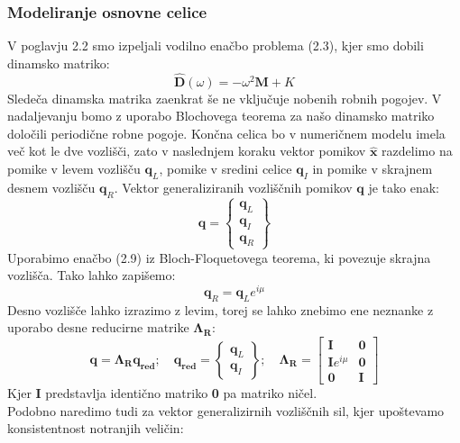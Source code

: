 \documentclass[12pt]{report}
\begin{document}
\subsubsection{Modeliranje osnovne celice}
V poglavju 2.2 smo izpeljali vodilno enačbo problema (2.3), kjer smo dobili dinamsko matriko:
\begin{equation}
  \mathbf{\hat{D}}(\omega)= -{\omega}^2 \mathbf{M}+K
\end{equation}
Sledeča dinamska matrika zaenkrat še ne vključuje nobenih robnih pogojev. V nadaljevanju bomo z uporabo Blochovega teorema za našo
dinamsko matriko določili periodične robne pogoje. Končna celica bo v numeričnem modelu imela več kot le dve vozlišči, zato v naslednjem koraku vektor pomikov $\mathbf{\hat{x}}$
razdelimo na pomike v levem vozlišču $\mathbf{q}_L$, pomike v sredini celice $\mathbf{q}_I$ in pomike v skrajnem desnem vozlišču $\mathbf{q}_R$. Vektor generaliziranih vozliščnih pomikov $\mathbf{q}$
je tako enak:
\begin{equation}
  \mathbf{q}=
    \begin{Bmatrix}
      \mathbf{q}_L \\
      \mathbf{q}_I \\
      \mathbf{q}_R
    \end{Bmatrix}
\end{equation}
Uporabimo enačbo (2.9) iz Bloch-Floquetovega teorema, ki povezuje skrajna vozlišča. Tako lahko zapišemo:
\begin{equation}
  \mathbf{q}_R = \mathbf{q}_L e^{i\mu}
\end{equation}
Desno vozlišče lahko izrazimo z levim, torej se lahko znebimo ene neznanke z uporabo desne reducirne matrike $\mathbf{\Lambda_R}$:
\begin{equation}
  \mathbf{q}=\mathbf{\Lambda_R q_{red}}; \quad 
  \mathbf{q_{red}} = \begin{Bmatrix}
    \mathbf{q}_L \\
    \mathbf{q}_I
  \end{Bmatrix}; \quad
  \mathbf{\Lambda_R} = \begin{bmatrix}
    \mathbf{I} & \mathbf{0} \\
    \mathbf{I}e^{i\mu} & \mathbf{0} \\
    \mathbf{0} & \mathbf{I}
  \end{bmatrix}
\end{equation}
Kjer \textbf{I} predstavlja identično matriko \textbf{0} pa matriko ničel.\\
Podobno naredimo tudi za vektor generalizirnih vozliščnih sil, kjer upoštevamo konsistentnost notranjih veličin:
\end{document}
